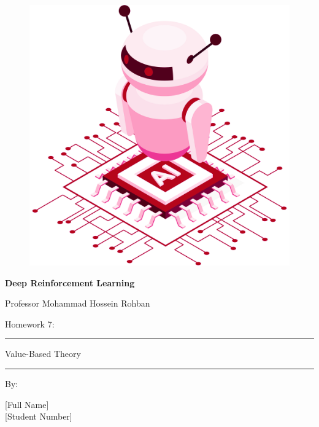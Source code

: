 \documentclass[12pt]{article}
\begin{document}
\thispagestyle{plain}

\begin{center}

\vspace*{-1.5cm}
\begin{figure}[!h]
    \centering
    \includegraphics[width=0.7\linewidth]{figs/cover-std.png}
\end{figure}

{

{\color{DarkBlue} {\fontsize{30}{50} \textbf{
Deep Reinforcement Learning
}}}

{\color{DarkBlue} {\Large
Professor Mohammad Hossein Rohban
}}
}


\vspace{20pt}

{


{\color{RedOrange}
{\Large
Homework 7:
}\\
}
{\color{BrickRed}
\rule{12cm}{0.5pt}

{\Huge
Value-Based Theory
}
\rule{12cm}{0.5pt}
}

\vspace{10pt}

{\color{RoyalPurple} { \small By:} } \\
\vspace{10pt}

{\color{Blue} { \LARGE [Full Name] } } \\
\vspace{5pt}
{\color{RoyalBlue} { \Large [Student Number] } }


}
\end{center}
\end{document}
